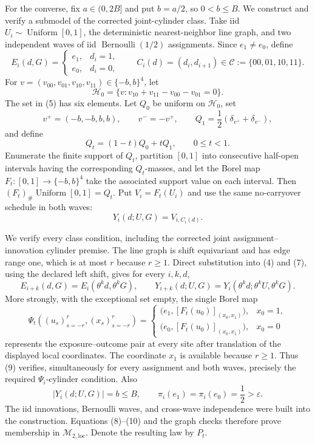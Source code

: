 For the converse, fix \(a\in(0,2B]\) and put \(b=a/2\), so \(0<b\le B\).  We construct and verify a submodel of the corrected joint-cylinder class.  Take iid \(U_i\sim\operatorname{Uniform}[0,1]\), the deterministic nearest-neighbor line graph, and two independent waves of iid \(\operatorname{Bernoulli}(1/2)\) assignments.  Since \(e_1\ne e_0\), define
\[
 E_i(d,G)=
 \begin{cases}
  e_1,&d_i=1,\\
  e_0,&d_i=0,
 \end{cases}
 \qquad
 C_i(d)=(d_i,d_{i+1})
 \in\mathcal C:=\{00,01,10,11\}. \tag{4}
\]
For \(v=(v_{00},v_{01},v_{10},v_{11})\in\{-b,b\}^4\), let
\[
 \mathcal H_0
 =\{v:v_{10}+v_{11}-v_{00}-v_{01}=0\}. \tag{5}
\]
The set in (5) has six elements.  Let \(Q_0\) be uniform on \(\mathcal H_0\), set
\[
 v^+=(-b,-b,b,b),
 \qquad v^-=-v^+,
 \qquad Q_1=\frac12(\delta_{v^+}+\delta_{v^-}),
\]
and define
\[
 Q_t=(1-t)Q_0+tQ_1,
 \qquad 0\le t<1. \tag{6}
\]
Enumerate the finite support of \(Q_t\), partition \([0,1]\) into consecutive half-open intervals having the corresponding \(Q_t\)-masses, and let the Borel map \(F_t:[0,1]\to\{-b,b\}^4\) take the associated support value on each interval.  Then \((F_t)_\#\operatorname{Uniform}[0,1]=Q_t\).  Put \(V_i=F_t(U_i)\) and use the same no-carryover schedule in both waves:
\[
 Y_i(d;U,G)=V_{i,C_i(d)}. \tag{7}
\]

We verify every class condition, including the corrected joint assignment--innovation cylinder premise.  The line graph is shift equivariant and has edge range one, which is at most \(r\) because \(r\ge1\).  Direct substitution into (4) and (7), using the declared left shift, gives for every \(i,k,d\),
\[
 E_{i+k}(d,G)=E_i(\theta^kd,\theta^kG),
 \qquad
 Y_{i+k}(d;U,G)=Y_i(\theta^kd;\theta^kU,\theta^kG). \tag{8}
\]
More strongly, with the exceptional set empty, the single Borel map
\[
 \Psi_t((u_s)_{s=-r}^{r},(x_s)_{s=-r}^{r})
 =
 \begin{cases}
  \bigl(e_1,[F_t(u_0)]_{(x_0,x_1)}\bigr),&x_0=1,\\
  \bigl(e_0,[F_t(u_0)]_{(x_0,x_1)}\bigr),&x_0=0
 \end{cases} \tag{9}
\]
represents the exposure--outcome pair at every site after translation of the displayed local coordinates.  The coordinate \(x_1\) is available because \(r\ge1\).  Thus (9) verifies, simultaneously for every assignment and both waves, precisely the required \(\Psi_i\)-cylinder condition.  Also
\[
 |Y_i(d;U,G)|=b\le B,
 \qquad
 \pi_i(e_1)=\pi_i(e_0)=\frac12>\varepsilon. \tag{10}
\]
The iid innovations, Bernoulli waves, and cross-wave independence were built into the construction.  Equations (8)--(10) and the graph checks therefore prove membership in \(\mathcal M_{2,\mathrm{loc}}\).  Denote the resulting law by \(P_t\).

